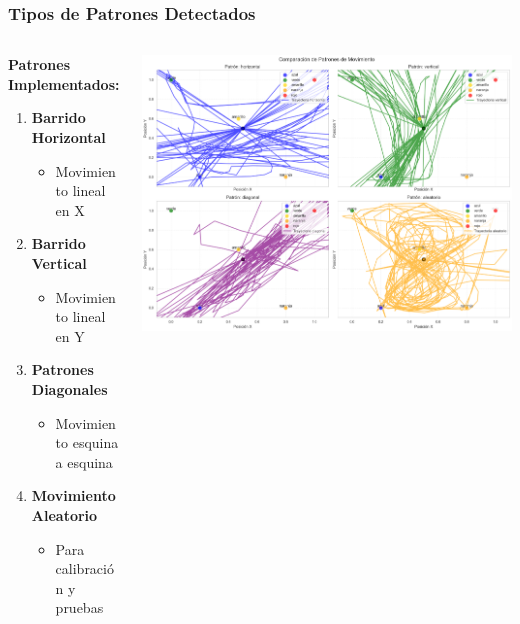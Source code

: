 \documentclass[xcolor=dvipsnames]{beamer}
\begin{document}
\begin{frame}
    \frametitle{Tipos de Patrones Detectados}
    \begin{columns}
        \begin{column}{0.5\textwidth}
            \textbf{Patrones Implementados:}
            \begin{enumerate}
                \item \textcolor{UniBlue}{\textbf{Barrido Horizontal}}
                \begin{itemize}
                    \item Movimiento lineal en X
                \end{itemize}
                
                \item \textcolor{UniRed}{\textbf{Barrido Vertical}}
                \begin{itemize}
                    \item Movimiento lineal en Y
                \end{itemize}
                
                \item \textcolor{UniGreen}{\textbf{Patrones Diagonales}}
                \begin{itemize}
                    \item Movimiento esquina a esquina
                \end{itemize}
                
                \item \textcolor{UniOrange}{\textbf{Movimiento Aleatorio}}
                \begin{itemize}
                    \item Para calibración y pruebas
                \end{itemize}
            \end{enumerate}
        \end{column}
        \begin{column}{0.5\textwidth}
            \begin{center}
                \includegraphics[width=\textwidth]{../assets/result.png}
                

\end{center}
\end{column}
\end{columns}
\end{frame}
\end{document}
